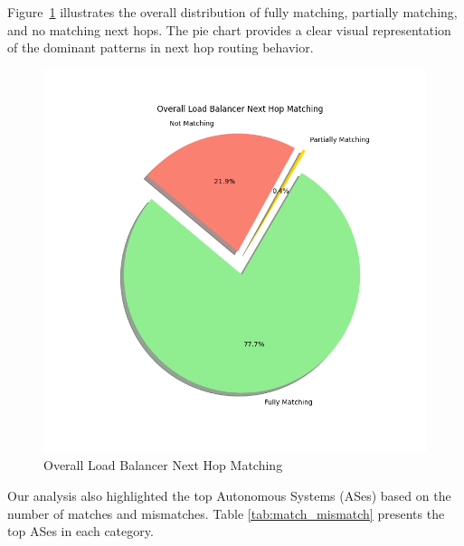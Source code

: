 \documentclass[12pt]{cwru_thesis}
\begin{document}
Figure~\ref{fig:overall_match_mismatch} illustrates the overall distribution of fully matching, partially matching, and no matching next hops. The pie chart provides a clear visual representation of the dominant patterns in next hop routing behavior.

\begin{figure}[h!]
    \centering
    \includegraphics[width=\linewidth]{figures/overall_match_mismatch.png}
    \caption{Overall Load Balancer Next Hop Matching}
    \label{fig:overall_match_mismatch}
\end{figure}

\newpage
Our analysis also highlighted the top Autonomous Systems (ASes) based on the number of matches and mismatches. Table \ref{tab:match_mismatch} presents the top ASes in each category.
\end{document}
